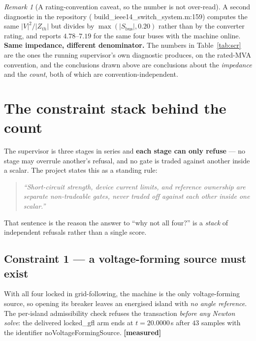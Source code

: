 \documentclass[12pt,a4paper]{article}
\theoremstyle{remark}
\newtheorem{remark}{Remark}
\newcommand{\code}[1]{{\ttfamily\small\hyphenchar\font=-1 #1}}
\newcommand{\measured}{\textcolor{ok}{\textbf{[measured]}}}
\begin{document}
\begin{remark}[A rating-convention caveat, so the number is not over-read]
A second diagnostic in the repository
(\code{build\_ieee14\_switch\_system.m:159}) computes the same $|V|^2/|Z_{th}|$
but divides by $\max(|S_{\text{bus}}|,0.20)$ rather than by the converter
rating, and reports $4.78$--$7.19$ for the same four buses with the machine
online. \textbf{Same impedance, different denominator.} The numbers in
Table~\ref{tab:scr} are the ones the running supervisor's own diagnostic
produces, on the rated-MVA convention, and the conclusions drawn above are
conclusions about the \emph{impedance} and the \emph{count}, both of which are
convention-independent.
\end{remark}

\section{The constraint stack behind the count}\label{sec:constraints}

The supervisor is three stages in series and \textbf{each stage can only
refuse} --- no stage may overrule another's refusal, and no gate is traded
against another inside a scalar. The project states this as a standing rule:

\begin{quote}\small\itshape
``Short-circuit strength, device current limits, and reference ownership are
separate non-tradeable gates, never traded off against each other inside one
scalar.''\par
\raggedleft\normalfont\code{(README.md:84--86)}\par
\end{quote}

That sentence is the reason the answer to ``why not all four?'' is a
\emph{stack} of independent refusals rather than a single score.

\subsection{Constraint 1 --- a voltage-forming source must exist}

With all four locked in grid-following, the machine is the only voltage-forming
source, so opening its breaker leaves an energised island with \emph{no angle
reference}. The per-island admissibility check refuses the transaction
\emph{before any Newton solve}: the delivered \code{locked\_gfl} arm ends at
$t=20.0000$\,s after $43$ samples with the identifier
\code{noVoltageFormingSource}. \measured
\end{document}
